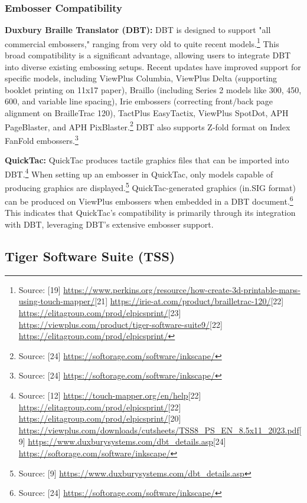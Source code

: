 \subsubsection{Embosser Compatibility}

\textbf{Duxbury Braille Translator (DBT):}
DBT is designed to support "all commercial embossers," ranging from very old to quite recent models.\footnote{Source: [19] \url{https://www.perkins.org/resource/how-create-3d-printable-maps-using-touch-mapper/}[21] \url{https://irie-at.com/product/brailletrac-120/}[22] \url{https://elitagroup.com/prod/elpicsprint/}[23] \url{https://viewplus.com/product/tiger-software-suite9/}[22] \url{https://elitagroup.com/prod/elpicsprint/}} This broad compatibility is a significant advantage, allowing users to integrate DBT into diverse existing embossing setups. Recent updates have improved support for specific models, including ViewPlus Columbia, ViewPlus Delta (supporting booklet printing on 11x17 paper), Braillo (including Series 2 models like 300, 450, 600, and variable line spacing), Irie embossers (correcting front/back page alignment on BrailleTrac 120), TactPlus EasyTactix, ViewPlus SpotDot, APH PageBlaster, and APH PixBlaster.\footnote{Source: [24] \url{https://softorage.com/software/inkscape/}} DBT also supports Z-fold format on Index FanFold embossers.\footnote{Source: [24] \url{https://softorage.com/software/inkscape/}}

\textbf{QuickTac:}
QuickTac produces tactile graphics files that can be imported into DBT.\footnote{Source: [12] \url{https://touch-mapper.org/en/help}[22] \url{https://elitagroup.com/prod/elpicsprint/}[22] \url{https://elitagroup.com/prod/elpicsprint/}[20] \url{https://viewplus.com/downloads/cutsheets/TSS8_PS_EN_8.5x11_2023.pdf}[9] \url{https://www.duxburysystems.com/dbt_details.asp}[24] \url{https://softorage.com/software/inkscape/}} When setting up an embosser in QuickTac, only models capable of producing graphics are displayed.\footnote{Source: [9] \url{https://www.duxburysystems.com/dbt_details.asp}} QuickTac-generated graphics (in.SIG format) can be produced on ViewPlus embossers when embedded in a DBT document.\footnote{Source: [24] \url{https://softorage.com/software/inkscape/}} This indicates that QuickTac's compatibility is primarily through its integration with DBT, leveraging DBT's extensive embosser support.

\subsection{Tiger Software Suite (TSS)}

